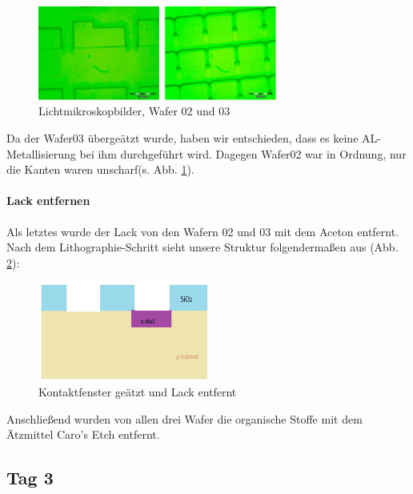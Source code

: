 \begin{figure}[H]
    \centering
        \includegraphics[width=0.7\textwidth]{bilder/LichtmikroskopbilderW23.png}
    \caption{Lichtmikroskopbilder, Wafer 02 und 03}
    \label{fig:LichtmikroskopbilderW23}
\end{figure}


Da der Wafer03 übergeätzt wurde, haben wir entschieden, dass es keine AL-Metallisierung bei ihm durchgeführt wird.
Dagegen Wafer02 war in Ordnung, nur die Kanten waren unscharf(s. Abb. \ref{fig:LichtmikroskopbilderW23}).


\paragraph[Lack entfernen]{Lack entfernen}

Als letztes wurde der Lack von den Wafern 02 und 03 mit dem Aceton entfernt.
Nach dem Lithographie-Schritt sieht unsere Struktur folgendermaßen aus (Abb. \ref{fig:KontaktfenstergeaetztundLackentfernt}):


\begin{figure}[H]
    \centering
        \includegraphics[width=0.5\textwidth]{bilder/KontaktfenstergeaetztundLackentfernt.png}
    \caption{Kontaktfenster geätzt und Lack entfernt}
    \label{fig:KontaktfenstergeaetztundLackentfernt}
\end{figure}

Anschließend wurden von allen drei Wafer die organische Stoffe mit dem Ätzmittel Caro's Etch entfernt.




\subsection[Tag 3]{Tag 3}

